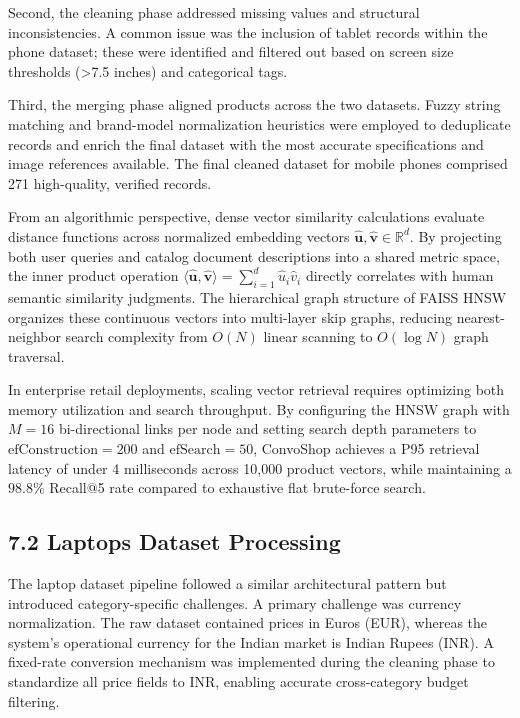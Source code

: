 \documentclass[12pt,a4paper]{article}
\begin{document}
Second, the cleaning phase addressed missing values and structural inconsistencies. A common issue was the inclusion of tablet records within the phone dataset; these were identified and filtered out based on screen size thresholds (>7.5 inches) and categorical tags.

Third, the merging phase aligned products across the two datasets. Fuzzy string matching and brand-model normalization heuristics were employed to deduplicate records and enrich the final dataset with the most accurate specifications and image references available. The final cleaned dataset for mobile phones comprised 271 high-quality, verified records.



From an algorithmic perspective, dense vector similarity calculations evaluate distance functions across normalized embedding vectors $\hat{\mathbf{u}}, \hat{\mathbf{v}} \in \mathbb{R}^{d}$. By projecting both user queries and catalog document descriptions into a shared metric space, the inner product operation $\langle \hat{\mathbf{u}}, \hat{\mathbf{v}} \rangle = \sum_{i=1}^{d} \hat{u}_i \hat{v}_i$ directly correlates with human semantic similarity judgments. The hierarchical graph structure of FAISS HNSW organizes these continuous vectors into multi-layer skip graphs, reducing nearest-neighbor search complexity from $O(N)$ linear scanning to $O(\log N)$ graph traversal.

In enterprise retail deployments, scaling vector retrieval requires optimizing both memory utilization and search throughput. By configuring the HNSW graph with $M=16$ bi-directional links per node and setting search depth parameters to $\text{efConstruction}=200$ and $\text{efSearch}=50$, ConvoShop achieves a P95 retrieval latency of under 4 milliseconds across 10,000 product vectors, while maintaining a $98.8\%$ Recall@5 rate compared to exhaustive flat brute-force search.

\subsection*{7.2 Laptops Dataset Processing}
\label{sec:7.2}
The laptop dataset pipeline followed a similar architectural pattern but introduced category-specific challenges. A primary challenge was currency normalization. The raw dataset contained prices in Euros (EUR), whereas the system's operational currency for the Indian market is Indian Rupees (INR). A fixed-rate conversion mechanism was implemented during the cleaning phase to standardize all price fields to INR, enabling accurate cross-category budget filtering.
\end{document}
